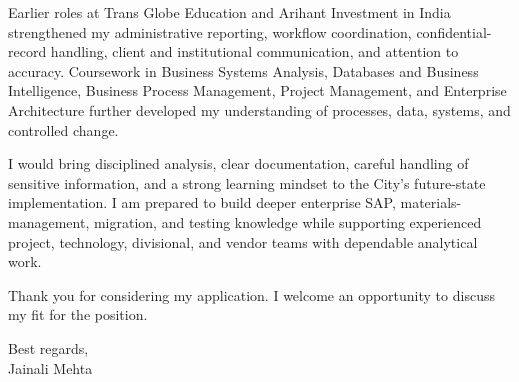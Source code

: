 \documentclass[letterpaper,10pt]{article}
\begin{document}
Earlier roles at Trans Globe Education and Arihant Investment in India strengthened my administrative reporting, workflow coordination, confidential-record handling, client and institutional communication, and attention to accuracy. Coursework in Business Systems Analysis, Databases and Business Intelligence, Business Process Management, Project Management, and Enterprise Architecture further developed my understanding of processes, data, systems, and controlled change.

I would bring disciplined analysis, clear documentation, careful handling of sensitive information, and a strong learning mindset to the City's future-state implementation. I am prepared to build deeper enterprise SAP, materials-management, migration, and testing knowledge while supporting experienced project, technology, divisional, and vendor teams with dependable analytical work.

Thank you for considering my application. I welcome an opportunity to discuss my fit for the position.

Best regards,\\[8pt]
Jainali Mehta
\end{document}
